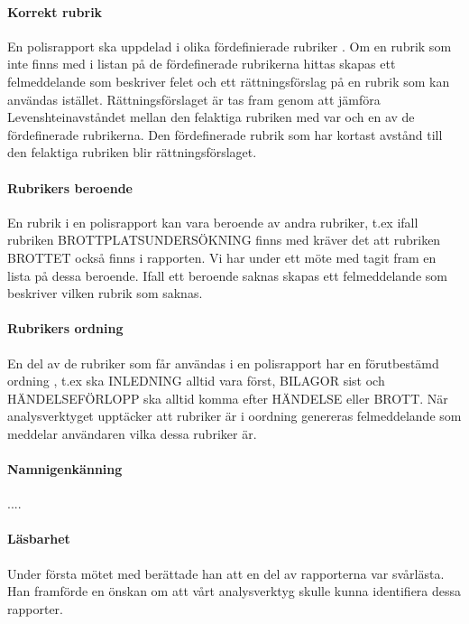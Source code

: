 \documentclass[swedish]{maucsthesis}
\begin{document}
\paragraph*{Korrekt rubrik}
En polisrapport ska uppdelad i olika fördefinierade rubriker
\citep{durtva:2017}. Om en rubrik som inte finns med i listan på de
fördefinerade rubrikerna hittas skapas ett felmeddelande som beskriver felet och
ett rättningsförslag på en rubrik som kan användas istället. Rättningsförslaget
är tas fram genom att jämföra Levenshteinavståndet mellan den felaktiga rubriken
med var och en av de fördefinerade rubrikerna. Den fördefinerade rubrik som har
kortast avstånd till den felaktiga rubriken blir rättningsförslaget.

\paragraph*{Rubrikers beroende}
En rubrik i en polisrapport kan vara beroende av andra rubriker, t.ex ifall
rubriken BROTTPLATSUNDERSÖKNING finns med kräver det att rubriken BROTTET också
finns i rapporten. Vi har under ett möte med \cite{perintervju:2019} tagit fram
en lista på dessa beroende. Ifall ett beroende saknas skapas ett felmeddelande
som beskriver vilken rubrik som saknas.

\paragraph*{Rubrikers ordning}
En del av de rubriker som får användas i en polisrapport har en förutbestämd
ordning \citep{durtva:2017}, t.ex ska INLEDNING alltid vara först, BILAGOR sist
och HÄNDELSEFÖRLOPP ska alltid komma efter HÄNDELSE eller BROTT. När
analysverktyget upptäcker att rubriker är i oordning genereras felmeddelande som
meddelar användaren vilka dessa rubriker är.

\paragraph*{Namnigenkänning}

....

\paragraph*{Läsbarhet}

Under första mötet med \cite{perintervju:2019} berättade han att en del av
rapporterna var svårlästa. Han framförde en önskan om att vårt analysverktyg
skulle kunna identifiera dessa rapporter.
\end{document}
